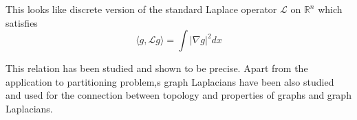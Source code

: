 \documentclass[10pt,a4paper, nocenter]{report}
\newcommand{\abs}[1]{\lvert {#1} \rvert}
\begin{document}
	 This looks like discrete version of the standard Laplace operator $\mathcal{L}$ on $\mathbb{R}^{n}$ which satisfies $$ \langle g,\mathcal{L}g \rangle = \int \abs{\nabla g}^{2} dx$$
	 
	 This relation has been studied and shown to be precise. Apart from the application to partitioning problem,s graph Laplacians have been also studied and used for the connection between topology and properties of graphs and graph Laplacians.
	
	
	\nocite{govl:96, parlet:98,stsu:90,gene:2018}
	
	\thispagestyle{fancy}
	
	 
	
\end{document}
